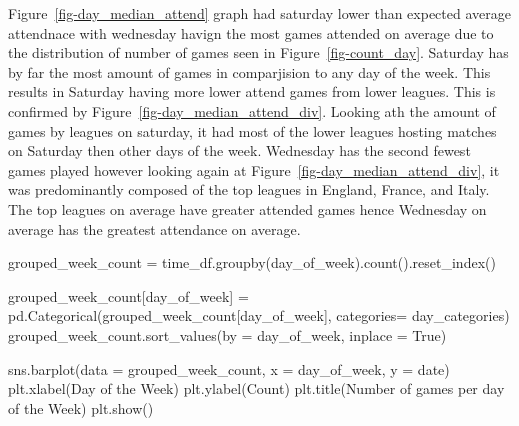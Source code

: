 \documentclass[
  letterpaper,
  DIV=11,
  numbers=noendperiod]{scrartcl}
\newenvironment{Shaded}{\begin{snugshade}}{\end{snugshade}}
\newcommand{\NormalTok}[1]{\textcolor[rgb]{0.00,0.23,0.31}{#1}}
\newcommand{\OperatorTok}[1]{\textcolor[rgb]{0.37,0.37,0.37}{#1}}
\newcommand{\StringTok}[1]{\textcolor[rgb]{0.13,0.47,0.30}{#1}}
\newcommand{\VariableTok}[1]{\textcolor[rgb]{0.07,0.07,0.07}{#1}}
\begin{document}
Figure~\ref{fig-day_median_attend} graph had saturday lower than
expected average attendnace with wednesday havign the most games
attended on average due to the distribution of number of games seen in
Figure~\ref{fig-count_day}. Saturday has by far the most amount of games
in comparjision to any day of the week. This results in Saturday having
more lower attend games from lower leagues. This is confirmed by
Figure~\ref{fig-day_median_attend_div}. Looking ath the amount of games
by leagues on saturday, it had most of the lower leagues hosting matches
on Saturday then other days of the week. Wednesday has the second fewest
games played however looking again at
Figure~\ref{fig-day_median_attend_div}, it was predominantly composed of
the top leagues in England, France, and Italy. The top leagues on
average have greater attended games hence Wednesday on average has the
greatest attendance on average.

\begin{Shaded}
\begin{Highlighting}[]
\NormalTok{grouped\_week\_count }\OperatorTok{=}\NormalTok{ time\_df.groupby(}\StringTok{\textquotesingle{}day\_of\_week\textquotesingle{}}\NormalTok{).count().reset\_index()}

\NormalTok{grouped\_week\_count[}\StringTok{\textquotesingle{}day\_of\_week\textquotesingle{}}\NormalTok{] }\OperatorTok{=}\NormalTok{ pd.Categorical(grouped\_week\_count[}\StringTok{\textquotesingle{}day\_of\_week\textquotesingle{}}\NormalTok{], categories}\OperatorTok{=}\NormalTok{ day\_categories)}
\NormalTok{grouped\_week\_count.sort\_values(by }\OperatorTok{=} \StringTok{\textquotesingle{}day\_of\_week\textquotesingle{}}\NormalTok{, inplace }\OperatorTok{=} \VariableTok{True}\NormalTok{)}


\NormalTok{sns.barplot(data }\OperatorTok{=}\NormalTok{ grouped\_week\_count, x }\OperatorTok{=} \StringTok{\textquotesingle{}day\_of\_week\textquotesingle{}}\NormalTok{, y }\OperatorTok{=} \StringTok{\textquotesingle{}date\textquotesingle{}}\NormalTok{)}
\NormalTok{plt.xlabel(}\StringTok{\textquotesingle{}Day of the Week\textquotesingle{}}\NormalTok{)}
\NormalTok{plt.ylabel(}\StringTok{\textquotesingle{}Count\textquotesingle{}}\NormalTok{)}
\NormalTok{plt.title(}\StringTok{\textquotesingle{}Number of games per day of the Week\textquotesingle{}}\NormalTok{)}
\NormalTok{plt.show()}
\end{Highlighting}
\end{Shaded}
\end{document}
